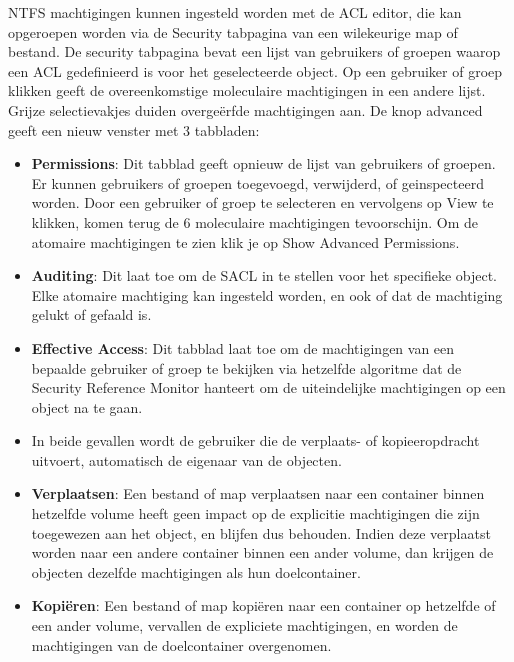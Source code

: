 \begin{enumerate}
{\begin{itemize}
				NTFS machtigingen kunnen ingesteld worden met de ACL editor, die kan opgeroepen worden via de Security tabpagina van een wilekeurige map of bestand. De security tabpagina bevat een lijst van gebruikers of groepen waarop een ACL gedefinieerd is voor het geselecteerde object. Op een gebruiker of groep klikken geeft de overeenkomstige moleculaire machtigingen in een andere lijst. Grijze selectievakjes duiden overgeërfde machtigingen aan. De knop advanced geeft een nieuw venster met 3 tabbladen:
				\begin{itemize}
					\item \textbf{Permissions}: Dit tabblad geeft opnieuw de lijst van gebruikers of groepen. Er kunnen gebruikers of groepen toegevoegd, verwijderd, of geinspecteerd worden. Door een gebruiker of groep te selecteren en vervolgens op View te klikken, komen terug de 6 moleculaire machtigingen tevoorschijn. Om de atomaire machtigingen te zien klik je op Show Advanced Permissions.
					\item \textbf{Auditing}: Dit laat toe om de SACL in te stellen voor het specifieke object. Elke atomaire machtiging kan ingesteld worden, en ook of dat de machtiging gelukt of gefaald is.
					\item \textbf{Effective Access}: Dit tabblad laat toe om de machtigingen van een bepaalde gebruiker of groep te bekijken via hetzelfde algoritme dat de Security Reference Monitor hanteert om de uiteindelijke machtigingen op een object na te gaan.
				\end{itemize}
			\end{itemize}
		}
		
		 { 
			\begin{itemize}
				\item In beide gevallen wordt de gebruiker die de verplaats- of kopieeropdracht uitvoert, automatisch de eigenaar van de objecten. 
				\item \textbf{Verplaatsen}: Een bestand of map verplaatsen naar een container binnen hetzelfde volume heeft geen impact op de explicitie machtigingen die zijn toegewezen aan het object, en blijfen dus behouden. Indien deze verplaatst worden naar een andere container binnen een ander volume, dan krijgen de objecten dezelfde machtigingen als hun doelcontainer.
				\item \textbf{Kopiëren}: Een bestand of map kopiëren naar een container op hetzelfde of een ander volume, vervallen de expliciete machtigingen, en worden de machtigingen van de doelcontainer overgenomen.
			\end{itemize}
		}
		

\end{enumerate}

